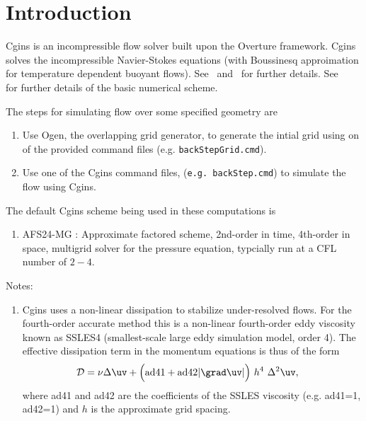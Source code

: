 \documentclass[11pt]{article}
\begin{document}
\tableofcontents

\clearpage


\section{Introduction}

Cgins is an incompressible flow solver built upon the Overture framework.
Cgins solves the incompressible Navier-Stokes equations (with Boussinesq approimation
for temperature dependent buoyant flows). See~\cite{CginsUserGuide} and~\cite{CginsReferenceManual} for further 
details. See~\cite{ICNS}~\cite{splitStep2003} for further details of the basic numerical scheme. 

The steps for simulating flow over some specified geometry are
\begin{enumerate}
  \item Use Ogen, the overlapping grid generator, to generate the intial grid using on of the provided command files (e.g. {\tt backStepGrid.cmd}).
  \item Use one of the Cgins command files,  ({\tt e.g. backStep.cmd}) to simulate the flow using Cgins.
\end{enumerate}

The default Cgins scheme being used in these computations is 
\begin{enumerate}
  \item AFS24-MG : Approximate factored scheme, 2nd-order in time, 4th-order in space, multigrid solver for the pressure equation,
    typcially run at a CFL number of $2-4$. 
\end{enumerate}

Notes:
\begin{enumerate}
  \item Cgins uses a non-linear dissipation to stabilize under-resolved flows. For the fourth-order accurate method this is
    a non-linear fourth-order eddy viscosity known as SSLES4 (smallest-scale large eddy simulation model, order 4).
  The effective dissipation term in the momentum equations is thus of the form
  \begin{align*}
     \Dc & =  \nu \Delta \uv  + \Big(\text{ad41} + \text{ad42} \vert \grad\uv\vert \Big) ~h^4~ \Delta^2 \uv , 
  \end{align*}
  where ad41 and ad42 are the coefficients of the SSLES viscosity (e.g. ad41=1, ad42=1) and $h$ is the approximate grid spacing.
\end{enumerate}
\end{document}
